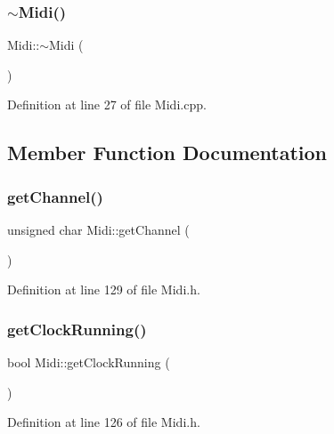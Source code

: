 \subsubsection{\texorpdfstring{$\sim$\+Midi()}{~Midi()}}
{\footnotesize\ttfamily Midi\+::$\sim$\+Midi (\begin{DoxyParamCaption}{ }\end{DoxyParamCaption})}



Definition at line 27 of file Midi.\+cpp.



\subsection{Member Function Documentation}
\mbox{\label{class_midi_a8372b7a7ac61f3f066d0932228cb53f8}} 
\subsubsection{\texorpdfstring{get\+Channel()}{getChannel()}}
{\footnotesize\ttfamily unsigned char Midi\+::get\+Channel (\begin{DoxyParamCaption}{ }\end{DoxyParamCaption})\hspace{0.3cm}{\ttfamily [inline]}}



Definition at line 129 of file Midi.\+h.

\mbox{\label{class_midi_ad4330bfa4bc5e7342eed4b083fcae837}} 
\subsubsection{\texorpdfstring{get\+Clock\+Running()}{getClockRunning()}}
{\footnotesize\ttfamily bool Midi\+::get\+Clock\+Running (\begin{DoxyParamCaption}{ }\end{DoxyParamCaption})\hspace{0.3cm}{\ttfamily [inline]}}



Definition at line 126 of file Midi.\+h.

